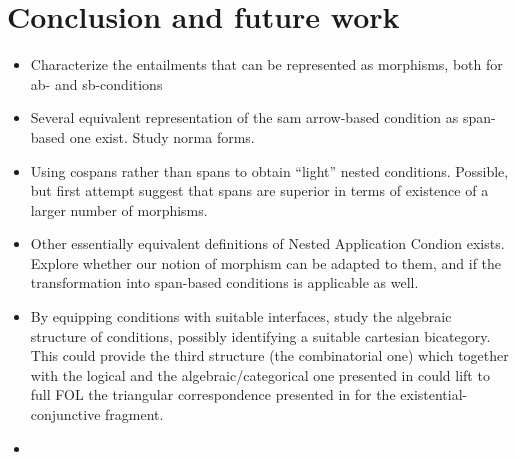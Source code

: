 \section{Conclusion and future work}

\begin{itemize}
    \item Characterize the entailments that can be represented as morphisms, both for ab- and sb-conditions
    \item Several equivalent representation of the sam arrow-based condition as span-based one exist. Study norma forms.
\item Using cospans rather than spans to obtain ``light'' nested conditions. Possible, but first attempt suggest that spans are superior in terms of existence of a larger number of morphisms.
\item Other essentially equivalent definitions of Nested Application Condion exists. Explore whether our notion of morphism can be adapted to them, and if the transformation into span-based conditions is applicable as well.
\item By equipping conditions with suitable interfaces, study the algebraic structure of conditions, possibly identifying a suitable cartesian bicategory. This could provide the third structure (the combinatorial one) which together with the logical and the algebraic/categorical one presented in \cite{DBLP:journals/corr/abs-2404-18795} could lift to full FOL the triangular correspondence presented in \cite{DBLP:conf/csl/BonchiSS18} for the existential-conjunctive fragment.
\item 
\end{itemize}

